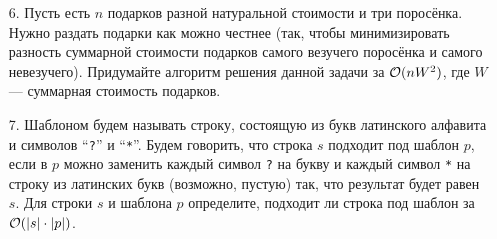 \begin{enumerate}
  \item[6.] 
 	Пусть есть $n$ подарков разной натуральной стоимости и три поросёнка. Нужно
    раздать подарки как можно честнее (так, чтобы минимизировать
    разность суммарной стоимости подарков самого везучего поросёнка и
    самого невезучего). Придумайте алгоритм решения данной задачи за
    $\mathcal{O}(nW^2)$, где $W$ --- суммарная стоимость подарков.

  \item[7.]
	Шаблоном будем называть строку, состоящую из букв латинского алфавита и символов ``\texttt{?}'' и ``\texttt{*}''.
	Будем говорить, что строка $s$ подходит под шаблон $p$, если в $p$ можно заменить каждый символ \texttt{?}
	на букву и каждый символ \texttt{*} на строку из латинских букв (возможно, пустую) так, что результат
	будет равен $s$. Для строки $s$ и шаблона $p$ определите, подходит ли строка под шаблон за $\mathcal{O}(|s| \cdot |p|)$.



\end{enumerate}
